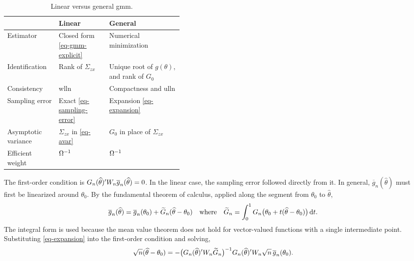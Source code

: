 \documentclass[a4paper,12pt]{article}
\begin{document}
\begin{table}[t]
	\centering
	\caption{Linear versus general \gls{gmm}.}
	\label{tab-linear-general}
	\begin{tabular}{llp{0.42\linewidth}}
		\toprule
		& Linear                              & General                                       \\
		\midrule
		Estimator           & Closed form \eqref{eq-gmm-explicit} & Numerical minimization                        \\
		Identification      & Rank of $\Sigma_{zx}$               & Unique root of $g(\theta)$, and rank of $G_0$ \\
		Consistency         & \gls{wlln}                          & Compactness and \gls{ulln}                    \\
		Sampling error      & Exact \eqref{eq-sampling-error}     & Expansion \eqref{eq-expansion}                \\
		Asymptotic variance & $\Sigma_{zx}$ in \eqref{eq-avar}    & $G_0$ in place of $\Sigma_{zx}$               \\
		Efficient weight    & $\Omega^{-1}$                        & $\Omega^{-1}$                                  \\
		\bottomrule
	\end{tabular}
\end{table}

The first-order condition is $G_n(\widehat\theta)^{\prime} W_n\overline g_n(\widehat\theta)=0$.
In the linear case, the sampling error followed directly from it.
In general, $\overline g_n(\widehat\theta)$ must first be linearized around $\theta_0$.
By the fundamental theorem of calculus, applied along the segment from $\theta_0$ to $\widehat\theta$,
\begin{align}\label{eq-expansion}
	\overline g_n(\widehat\theta)=\overline g_n(\theta_0)+\widetilde G_n(\widehat\theta-\theta_0)
	\quad\text{where}\quad
	\widetilde G_n=\int_0^1G_n\bigl(\theta_0+t(\widehat\theta-\theta_0)\bigr)\mathop{}\!{\mathrm{d}}{t}.
\end{align}
The integral form is used because the mean value theorem does not hold for vector-valued functions with a single intermediate point.
Substituting \eqref{eq-expansion} into the first-order condition and solving,
\begin{align}\label{eq-general-error}
	\sqrt n(\widehat\theta-\theta_0)
	=-\bigl(G_n(\widehat\theta)^{\prime} W_n\widetilde G_n\bigr)^{-1} G_n(\widehat\theta)^{\prime} W_n\sqrt n\,\overline g_n(\theta_0).
\end{align}
\end{document}
